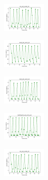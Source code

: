 \begin{figure}[H]
    \centering
    \begin{subfigure}
        \centering
        \includegraphics[width=0.234\textwidth]{img/ils-es/iris_set_const_20_949004259_cost.png}
    \end{subfigure}
    \hfill
    \begin{subfigure}
        \centering
        \includegraphics[width=0.234\textwidth]{img/ils-es/ecoli_set_const_20_949004259_cost.png}
    \end{subfigure}
    \hfill
    \begin{subfigure}
        \centering
        \includegraphics[width=0.234\textwidth]{img/ils-es/rand_set_const_20_949004259_cost.png}
    \end{subfigure}
    \hfill
    \begin{subfigure}
        \centering
        \includegraphics[width=0.234\textwidth]{img/ils-es/newthyroid_set_const_20_949004259_cost.png}
    \end{subfigure}
    \hfill
    \begin{subfigure}
        \centering
        \includegraphics[width=0.234\textwidth]{img/ils-es/iris_set_const_20_589741062_cost.png}
    \end{subfigure}
    \hfill

\end{figure}
